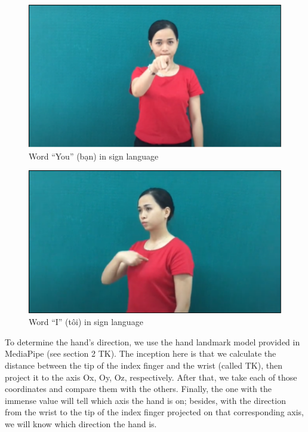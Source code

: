 \begin{figure}[H]
  \centering
  \includegraphics[width=\textwidth]{img/Chap3/WordYouInSignLanguage.png}
  \caption{Word “You” (bạn) in sign language}
  \label{fig:Chap3-WordYouInSignLanguage}
\end{figure}

\begin{figure}[H]
  \centering
  \includegraphics[width=\textwidth]{img/Chap3/WordIInSignLanguage.png}
  \caption{Word “I” (tôi) in sign language}
  \label{fig:Chap3-WordIInSignLanguage}
\end{figure}

To determine the hand’s direction, we use the hand landmark model provided in MediaPipe (see section 2 TK). The inception here is that we calculate the distance between the tip of the index finger and the wrist (called TK), then project it to the axis Ox, Oy, Oz, respectively. After that, we take each of those coordinates and compare them with the others. Finally, the one with the immense value will tell which axis the hand is on; besides, with the direction from the wrist to the tip of the index finger projected on that corresponding axis, we will know which direction the hand is.

